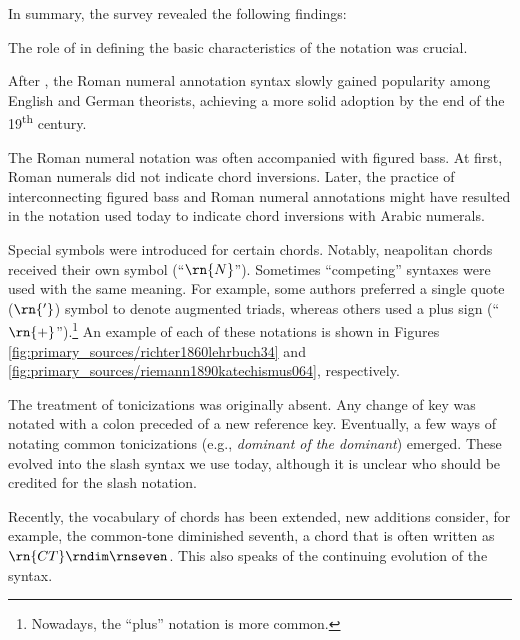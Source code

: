 In summary, the survey revealed the following findings:

The role of \textcite{weber1818versuch} in defining the
basic characteristics of the notation was crucial.


After \textcite{weber1818versuch}, the Roman numeral
annotation syntax slowly gained popularity among English and
German theorists, achieving a more solid adoption by the end
of the 19\textsuperscript{th} century.

 The Roman numeral notation was often accompanied with
figured bass. At first, Roman numerals did not indicate
chord inversions. Later, the practice of interconnecting
figured bass and Roman numeral annotations might have
resulted in the notation used today to indicate chord
inversions with Arabic numerals.

Special symbols were introduced for certain chords. Notably,
\gls{neapolitan} chords received their own symbol
(``$\rn{N}$''). Sometimes ``competing'' syntaxes were used
with the same meaning. For example, some authors preferred a
single quote ($\rn{'}$) symbol to denote augmented triads,
whereas others used a plus sign
(``$\rn{+}$'').\footnote{Nowadays, the ``plus'' notation is
more common.} An example of each of these notations is shown
in Figures \ref{fig:primary_sources/richter1860lehrbuch34} and
\ref{fig:primary_sources/riemann1890katechismus064}, respectively.

The treatment of tonicizations was originally absent. Any
change of key was notated with a colon preceded of a new
reference key. Eventually, a few ways of notating common
tonicizations (e.g., \emph{dominant of the dominant})
emerged. These evolved into the slash syntax we use today,
although it is unclear who should be credited for the slash
notation.

Recently, the vocabulary of chords has been extended, new
additions consider, for example, the common-tone diminished
seventh, a chord that is often written as
$\rn{CT}\rndim\rnseven$. This also speaks of the continuing
evolution of the syntax.
